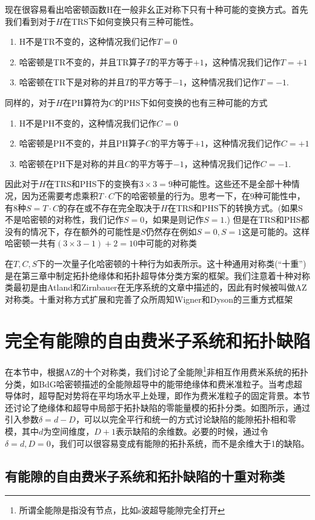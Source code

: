 \documentclass[a4paper]{article}
\numberwithin{equation}{subsection}
\begin{document}
现在很容易看出哈密顿函数H在一般非幺正对称下只有十种可能的变换方式。首先我们看到对于$H$在TRS下如何变换只有三种可能性。
\begin{enumerate}
    \item H不是TR不变的，这种情况我们记作$T=0$
    \item 哈密顿是TR不变的，并且TR算子$T$的平方等于$+1$，这种情况我们记作$T=+1$
    \item 哈密顿在TR下是对称的并且$T$的平方等于$-1$，这种情况我们记作$T=-1$.
\end{enumerate}
同样的，对于$H$在PH算符为$C$的PHS下如何变换的也有三种可能的方式
\begin{enumerate}
    \item H不是PH不变的，这种情况我们记作$C=0$
    \item 哈密顿是PH不变的，并且PH算子$C$的平方等于$+1$，这种情况我们记作$C=+1$
    \item 哈密顿在PH下是对称的并且$C$的平方等于$-1$，这种情况我们记作$C=-1$.
\end{enumerate}
因此对于$H$在TRS和PHS下的变换有$3\times 3=9$种可能性。这些还不是全部十种情况，因为还需要考虑乘积$T\cdot C$下的哈密顿量的行为。思考一下，在$9$种可能性中，有$8$种$S=T\cdot C$的存在或不存在完全取决于$H$在TRS和PHS下的转换方式。(如果S不是哈密顿的对称性，我们记作$S=0$，如果是则记作$S=1$.) 但是在TRS和PHS都没有的情况下，存在额外的可能性是$S$仍然存在例如$S=0,S=1$这是可能的。这样哈密顿一共有$(3\times 3-1)+2=10$中可能的对称类

在$T,C,S$下的一次量子化哈密顿的十种行为如表所示。这十种通用对称类(“十重”)是在第三章中制定拓扑绝缘体和拓扑超导体分类方案的框架。我们注意着十种对称类最初是由Atland和Zirnbauer在无序系统的文章中描述的，因此有时候被叫做AZ对称类。十重对称方式扩展和完善了众所周知Wigner和Dyson的三重方式框架
\section{完全有能隙的自由费米子系统和拓扑缺陷}
在本节中，根据AZ的十个对称类，我们讨论了全能隙\footnote{所谓全能隙是指没有节点，比如s波超导能隙完全打开}非相互作用费米系统的拓扑分类，如BdG哈密顿描述的全能隙超导中的能带绝缘体和费米准粒子。当考虑超导体时，超导配对势将在平均场水平上处理，即作为费米准粒子的固定背景。本节还讨论了绝缘体和超导中局部于拓扑缺陷的零能量模的拓扑分类。如图所示，通过引入参数$\delta=d-D$，可以以完全平行和统一的方式讨论缺陷的能隙拓扑相和零模，其中$d$为空间维度，$D+1$表示缺陷的余维数。必要的时候，通过令$\delta=d,D=0$，我们可以很容易变成有能隙的拓扑系统，而不是余维大于1的缺陷。
\subsection{有能隙的自由费米子系统和拓扑缺陷的十重对称类}
\end{document}
